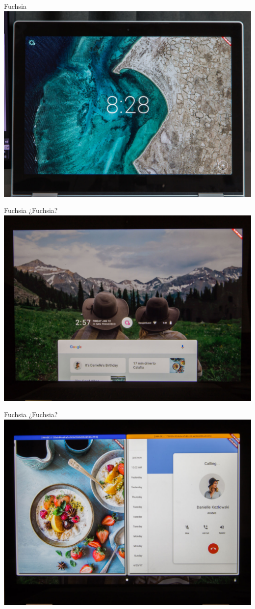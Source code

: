 \begin{frame}{Fuchsia}
    \centering
    \includegraphics[height=0.7\textheight]{images/fuchsia-1.jpg}
\end{frame}

\begin{frame}{Fuchsia}
    \centering
    \Huge{¿Fuchsia?} \\
    \includegraphics[height=0.7\textheight]{images/fuchsia-2.jpg}
\end{frame}

\begin{frame}{Fuchsia}
    \centering
    \Huge{¿Fuchsia?} \\
    \includegraphics[height=0.7\textheight]{images/fuchsia-3.jpg}
\end{frame}

